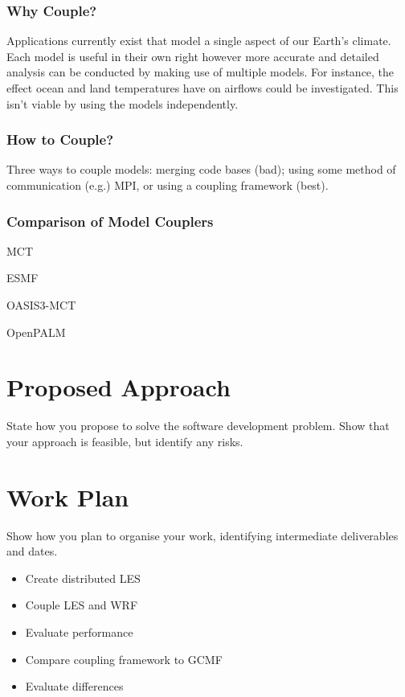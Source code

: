 \documentclass[a4paper,twocolumn,10pt]{article}
\begin{document}
\subsubsection*{Why Couple?}

Applications currently exist that model a single aspect of our Earth's climate.
Each model is useful in their own right however more accurate and detailed
analysis can be conducted by making use of multiple models. For instance, the
effect ocean and land temperatures have on airflows could be investigated. This
isn't viable by using the models independently.

\subsubsection*{How to Couple?}

Three ways to couple models: merging code bases (bad); using some method of
communication (e.g.) MPI, or using a coupling framework (best).

\subsubsection*{Comparison of Model Couplers}

MCT

ESMF

OASIS3-MCT

OpenPALM

\section*{Proposed Approach}

State how you propose to solve the software development problem. Show that your
approach is feasible, but identify any risks.

\section*{Work Plan}

Show how you plan to organise your work, identifying intermediate deliverables
and dates.

\begin{itemize}
	\item Create distributed LES
	\item Couple LES and WRF
	\item Evaluate performance
	\item Compare coupling framework to GCMF
	\item Evaluate differences
\end{itemize}



\end{document}
